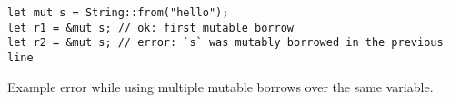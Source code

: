 \begin{listing}
    \begin{verbatim}
let mut s = String::from("hello");
let r1 = &mut s; // ok: first mutable borrow
let r2 = &mut s; // error: `s` was mutably borrowed in the previous line
    \end{verbatim}
    \caption{Example error while using multiple mutable borrows over the same variable.}
    \label{lst:rust-borrow-n-mut}
\end{listing}